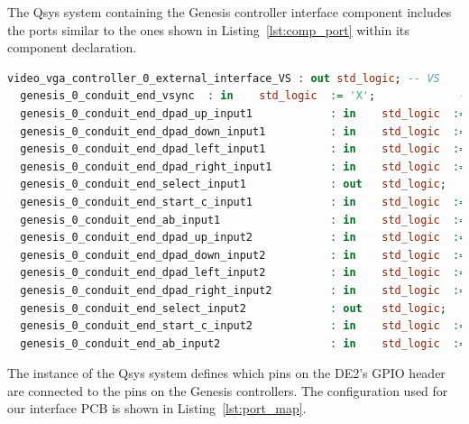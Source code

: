 \documentclass{capstonedoc}
\begin{document}
The Qsys system containing the Genesis controller interface component includes
the ports similar to the ones shown in Listing~\ref{lst:comp_port} within its
component declaration.

\begin{lstlisting}[language={vhdl},caption={Qsys System Ports for Genesis Controller},label={lst:comp_port}]
  video_vga_controller_0_external_interface_VS : out std_logic; -- VS
  genesis_0_conduit_end_vsync  : in    std_logic  := 'X';             -- vsync
  genesis_0_conduit_end_dpad_up_input1            : in    std_logic  := 'X';             -- dpad_up_input1
  genesis_0_conduit_end_dpad_down_input1          : in    std_logic  := 'X';             -- dpad_down_input1
  genesis_0_conduit_end_dpad_left_input1          : in    std_logic  := 'X';             -- dpad_left_input1
  genesis_0_conduit_end_dpad_right_input1         : in    std_logic  := 'X';             -- dpad_right_input1
  genesis_0_conduit_end_select_input1             : out   std_logic;                     -- select_input1
  genesis_0_conduit_end_start_c_input1            : in    std_logic  := 'X';             -- start_c_input1
  genesis_0_conduit_end_ab_input1                 : in    std_logic  := 'X';             -- ab_input1
  genesis_0_conduit_end_dpad_up_input2            : in    std_logic  := 'X';             -- dpad_up_input2
  genesis_0_conduit_end_dpad_down_input2          : in    std_logic  := 'X';             -- dpad_down_input2
  genesis_0_conduit_end_dpad_left_input2          : in    std_logic  := 'X';             -- dpad_left_input2
  genesis_0_conduit_end_dpad_right_input2         : in    std_logic  := 'X';             -- dpad_right_input2
  genesis_0_conduit_end_select_input2             : out   std_logic;                     -- select_input2
  genesis_0_conduit_end_start_c_input2            : in    std_logic  := 'X';             -- start_c_input2
  genesis_0_conduit_end_ab_input2                 : in    std_logic  := 'X';             -- ab_input2
\end{lstlisting}

The instance of the Qsys system defines which pins on the DE2's GPIO header are
connected to the pins on the Genesis controllers. The configuration used for our
interface PCB is shown in Listing~\ref{lst:port_map}.
\end{document}
